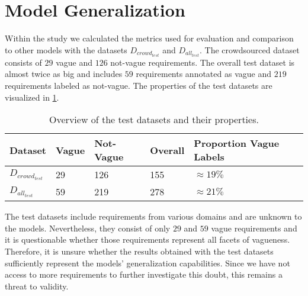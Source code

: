 \section{Model Generalization}
\label{chp:threats_to_validity:sec:model_generalization}

Within the study we calculated the metrics used for evaluation and comparison to other models with the datasets $D_{crowd_{test}}$ and $D_{all_{test}}$.
The crowdsourced dataset consists of $29$ vague and $126$ not-vague requirements.
The overall test dataset is almost twice as big and includes $59$ requirements annotated as vague and $219$ requirements labeled as not-vague.
The properties of the test datasets are visualized in \cref{tab:threats_to_validity:sec:model_generalization:test_datasets}.

\begin{table}[htpb]
    \centering
    \begin{tabular}{l l l l l}
        \toprule
        Dataset & Vague & Not-Vague & Overall & Proportion Vague Labels \\
        \midrule
        $D_{crowd_{test}}$ & 29 & 126 & 155 & $\approx19\%$\\
        $D_{all_{test}}$ & 59 & 219 & 278 &  $\approx21\%$\\
        \bottomrule
    \end{tabular}
    \caption[Overview of test datasets]{Overview of the test datasets and their properties.}\label{tab:threats_to_validity:sec:model_generalization:test_datasets}
\end{table}

The test datasets include requirements from various domains \parencite{Kummeth:2020} and are unknown to the models.
Nevertheless, they consist of only $29$ and $59$ vague requirements and it is questionable whether those requirements represent all facets of vagueness.
Therefore, it is unsure whether the results obtained with the test datasets sufficiently represent the models' generalization capabilities.
Since we have not access to more requirements to further investigate this doubt, this remains a threat to validity.

